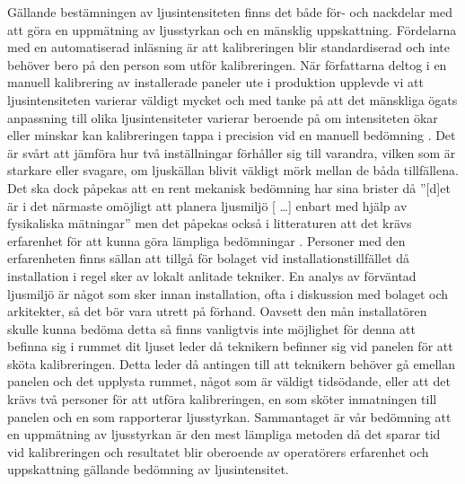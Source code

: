     Gällande bestämningen av ljusintensiteten finns det både för- och nackdelar med att göra en uppmätning av ljusstyrkan och en mänsklig uppskattning. Fördelarna med en automatiserad inläsning är att kalibreringen blir standardiserad och inte behöver bero på den person som utför kalibreringen. När författarna deltog i en manuell kalibrering av installerade paneler ute i produktion upplevde vi att ljusintensiteten varierar väldigt mycket och med tanke på att det mänskliga ögats anpassning till olika ljusintensiteter varierar beroende på om intensiteten ökar eller minskar kan kalibreringen tappa i precision vid en manuell bedömning \cite[s.~273]{aot}.  Det är svårt att jämföra hur två inställningar förhåller sig till varandra, vilken som är starkare eller svagare, om ljuskällan blivit väldigt mörk mellan de båda tillfällena. Det ska dock påpekas att en rent mekanisk bedömning har sina brister då ''[d]et är i det närmaste omöjligt att planera ljusmiljö [ \dots ] enbart med hjälp av fysikaliska mätningar'' men det påpekas också i litteraturen att det krävs erfarenhet för att kunna göra lämpliga bedömningar \cite[s.~278]{aot}. Personer med den erfarenheten finns sällan att tillgå för bolaget vid installationstillfället då installation i regel sker av lokalt anlitade tekniker. En analys av förväntad ljusmiljö är något som sker innan installation, ofta i diskussion med bolaget och arkitekter, så det bör vara utrett på förhand. Oavsett den mån installatören skulle kunna bedöma detta så finns vanligtvis inte möjlighet för denna att befinna sig i rummet dit ljuset leder då teknikern befinner sig vid panelen för att sköta kalibreringen. Detta leder då antingen till att teknikern behöver gå emellan panelen och det upplysta rummet, något som är väldigt tidsödande, eller att det krävs två personer för att utföra kalibreringen, en som sköter inmatningen till panelen och en som rapporterar ljusstyrkan. Sammantaget är vår bedömning att en uppmätning av ljusstyrkan är den mest lämpliga metoden då det sparar tid vid kalibreringen och resultatet blir oberoende av operatörers erfarenhet och uppskattning gällande bedömning av ljusintensitet.

